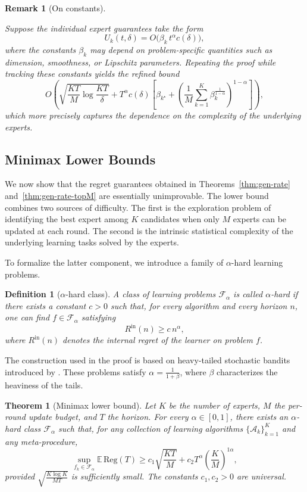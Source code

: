 \documentclass[a4paper,14pt]{extarticle}
\theoremstyle{plain}
\newtheorem{definition}{Definition}
\newtheorem{remark}{Remark}
\newtheorem{theorem}{Theorem}
\begin{document}
\begin{remark}[On constants]
\label{rem:beta_dependence}

Suppose the individual expert guarantees take the form
\[
U_k(t,\delta)
=
O\!\bigl(
\beta_k\, t^\alpha c(\delta)
\bigr),
\]
where the constants $\beta_k$ may depend on problem-specific quantities
such as dimension, smoothness, or Lipschitz parameters. Repeating the
proof while tracking these constants yields the refined bound
\[
O\!\left(
\sqrt{\frac{KT}{M}\log\frac{KT}{\delta}}
+
T^\alpha c(\delta)
\left[
\beta_{k^\star}
+
\left(
\frac1M
\sum_{k=1}^{K}
\beta_k^{\frac1{1-\alpha}}
\right)^{1-\alpha}
\right]
\right),
\]
which more precisely captures the dependence on the complexity of the
underlying experts.

\end{remark}

\subsection{Minimax Lower Bounds}
\label{appendix:lower-bounds}

We now show that the regret guarantees obtained in Theorems~\ref{thm:gen-rate} and~\ref{thm:gen-rate-topM} are essentially unimprovable. The lower bound combines two sources of difficulty. The first is the exploration problem of identifying the best expert among $K$ candidates when only $M$ experts can be updated at each round. The second is the intrinsic statistical complexity of the underlying learning tasks solved by the experts.

To formalize the latter component, we introduce a family of $\alpha$-hard learning problems.

\begin{definition}[$\alpha$-hard class]
\label{def:alpha-class}
A class of learning problems $\mathcal F_\alpha$ is called $\alpha$-hard if there exists a constant $c>0$ such that, for every
algorithm and every horizon $n$, one can find $f\in\mathcal F_\alpha$ satisfying
\[
R^{\mathrm{in}}(n) \ge c\, n^\alpha,
\]
where $R^{\mathrm{in}}(n)$ denotes the internal regret of the learner on
problem $f$.
\end{definition}

The construction used in the proof is based on heavy-tailed stochastic bandits introduced by \cite{bubeck2013bandits}. These problems satisfy $\alpha=\frac{1}{1+\beta}$, where $\beta$ characterizes the heaviness of the tails.

\begin{theorem}[Minimax lower bound]
\label{thm:mt-alpha}
Let $K$ be the number of experts, $M$ the per-round update budget, and $T$ the horizon. For every $\alpha\in[0,1]$, there exists an $\alpha$-hard class $\mathcal F_\alpha$ such that, for any collection of learning algorithms $\{\mathscr A_k\}_{k=1}^{K}$ and any meta-procedure,
\[
\sup_{f_k\in\mathcal F_\alpha} \mathbb E\,\mathrm{Reg}(T) \ge c_1\sqrt{\frac{KT}{M}} + c_2 T^\alpha \left(\frac{K}{M}\right)^{1 \alpha},
\]
provided $\sqrt{\frac{K\log K}{MT}}$ is sufficiently small. The constants $c_1,c_2>0$ are universal.
\end{theorem}
\end{document}
